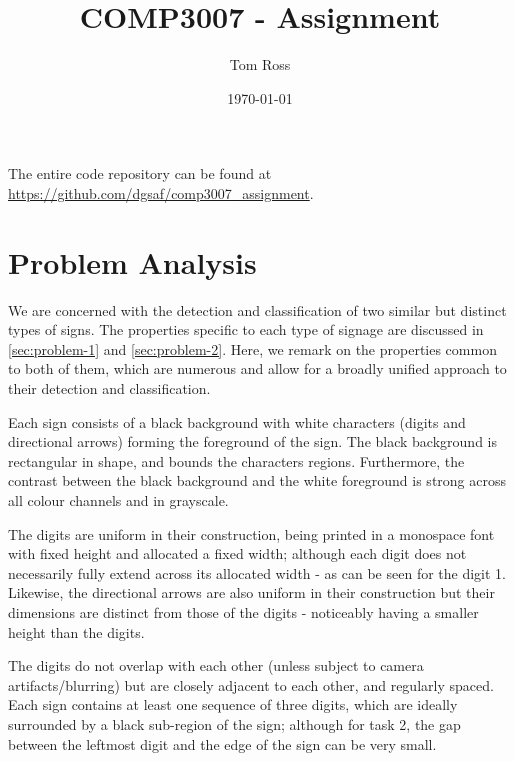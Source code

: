\documentclass{article}
\title{COMP3007 - Assignment}
\author{Tom Ross}
\date{\today}
\begin{document}
The entire code repository can be found at
\url{https://github.com/dgsaf/comp3007_assignment}.

\tableofcontents

\listoffigures

\listoftables

\clearpage


\section{Problem Analysis}
\label{sec:problem-analysis}

We are concerned with the detection and classification of two similar but
distinct types of signs.
The properties specific to each type of signage are discussed in
\autoref{sec:problem-1} and \autoref{sec:problem-2}.
Here, we remark on the properties common to both of them, which are numerous and
allow for a broadly unified approach to their detection and classification.

Each sign consists of a black background with white characters (digits and
directional arrows) forming the foreground of the sign.
The black background is rectangular in shape, and bounds the characters
regions.
Furthermore, the contrast between the black background and the white foreground
is strong across all colour channels and in grayscale.

The digits are uniform in their construction, being printed in a monospace
font with fixed height and allocated a fixed width; although each digit does
not necessarily fully extend across its allocated width - as can be seen for the
digit 1.
Likewise, the directional arrows are also uniform in their construction but
their dimensions are distinct from those of the digits - noticeably having a
smaller height than the digits.

The digits do not overlap with each other (unless subject to camera
artifacts/blurring) but are closely adjacent to each other, and regularly
spaced.
Each sign contains at least one sequence of three digits, which are ideally
surrounded by a black sub-region of the sign; although for task 2, the gap
between the leftmost digit and the edge of the sign can be very small.
\end{document}
